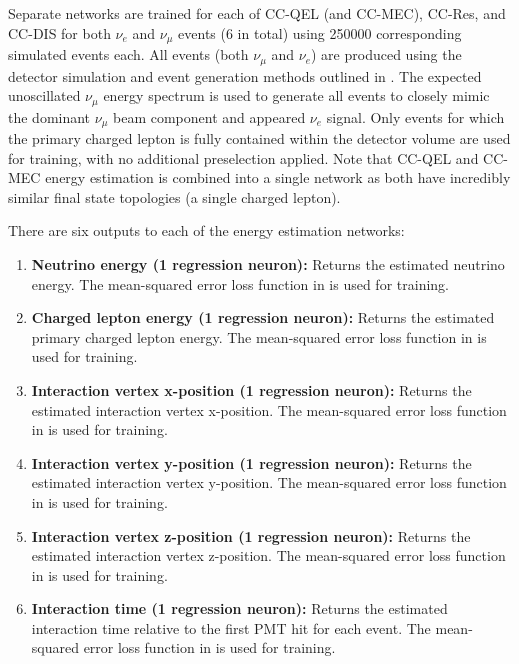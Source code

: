 Separate networks are trained for each of CC-QEL (and CC-MEC), CC-Res, and CC-DIS for both
$\nu_{e}$ and $\nu_{\mu}$ events (6 in total) using 250000 corresponding simulated events each.
All events (both $\nu_{\mu}$ and $\nu_{e}$) are produced using the detector simulation and event
generation methods outlined in . The expected unoscillated
\chipsfive $\nu_{\mu}$ energy spectrum is used to generate all events to closely mimic the
dominant $\nu_{\mu}$ beam component and appeared $\nu_{e}$ signal. Only events for which the
primary charged lepton is fully contained within the detector volume are used for training, with
no additional preselection applied. Note that CC-QEL and CC-MEC energy estimation is combined into
a single network as both have incredibly similar final state topologies (a single charged lepton).

There are six outputs to each of the energy estimation networks:
\begin{enumerate}
    \item \textbf{Neutrino energy (1 regression neuron):} Returns the estimated neutrino energy.
          The mean-squared error loss function in  is used for training.
    \item \textbf{Charged lepton energy (1 regression neuron):} Returns the estimated primary
          charged lepton energy. The mean-squared error loss function in  is
          used for training.
    \item \textbf{Interaction vertex x-position (1 regression neuron):} Returns the estimated
          interaction vertex x-position. The mean-squared error loss function in
           is used for training.
    \item \textbf{Interaction vertex y-position (1 regression neuron):} Returns the estimated
          interaction vertex y-position. The mean-squared error loss function in
           is used for training.
    \item \textbf{Interaction vertex z-position (1 regression neuron):} Returns the estimated
          interaction vertex z-position. The mean-squared error loss function in
           is used for training.
    \item \textbf{Interaction time (1 regression neuron):} Returns the estimated interaction time
          relative to the first PMT hit for each event. The mean-squared error loss function in
           is used for training.
\end{enumerate}

